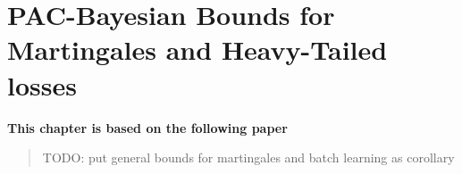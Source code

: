 \chapter{PAC-Bayesian Bounds for Martingales and Heavy-Tailed losses}
\label{chap:pb-supermartingales}

\addchapterlof
\addchapterloa
\addchapterloe

\vspace{-1.5cm}
\begin{center}
\textbf{This chapter is based on the following paper}\\[0.1cm]
\end{center}

\minitoc

\begin{abstract}
TODO: put general bounds for martingales and batch learning as corollary
\end{abstract}

\newpage

